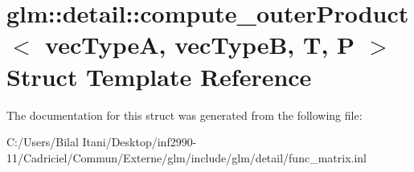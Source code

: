 \hypertarget{structglm_1_1detail_1_1compute__outer_product}{}\section{glm\+:\+:detail\+:\+:compute\+\_\+outer\+Product$<$ vec\+TypeA, vec\+TypeB, T, P $>$ Struct Template Reference}
\label{structglm_1_1detail_1_1compute__outer_product}


The documentation for this struct was generated from the following file\+:\begin{DoxyCompactItemize}
\item 
C\+:/\+Users/\+Bilal Itani/\+Desktop/inf2990-\/11/\+Cadriciel/\+Commun/\+Externe/glm/include/glm/detail/func\+\_\+matrix.\+inl\end{DoxyCompactItemize}
